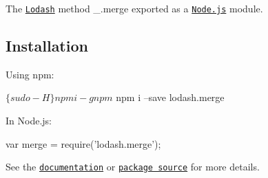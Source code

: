 The \href{https://lodash.com/}{\tt Lodash} method {\ttfamily \+\_\+.\+merge} exported as a \href{https://nodejs.org/}{\tt Node.\+js} module.

\subsection*{Installation}

Using npm\+: 
\begin{DoxyCode}
$ \{sudo -H\} npm i -g npm
$ npm i --save lodash.merge
\end{DoxyCode}


In Node.\+js\+: 
\begin{DoxyCode}
var merge = require('lodash.merge');
\end{DoxyCode}


See the \href{https://lodash.com/docs#merge}{\tt documentation} or \href{https://github.com/lodash/lodash/blob/4.6.1-npm-packages/lodash.merge}{\tt package source} for more details. 